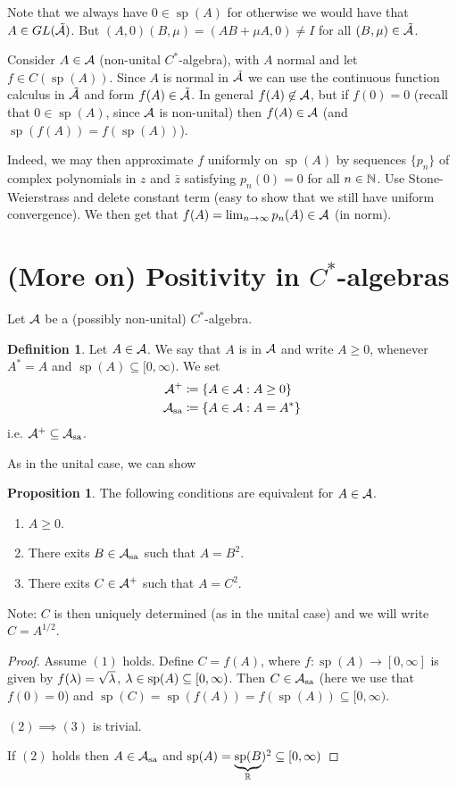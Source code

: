 \documentclass[10pt,english,a4paper]{article}
\theoremstyle{definition}
\newtheorem*{definition}{Definition}
\newtheorem*{proposition}{Proposition}
\let\emph\relax %
\def\Assa{\As_{\text{sa}}}
\DeclareMathOperator{\Sp}{sp}
\begin{document}
Note that we always have $0 \in \Sp(A)$ for otherwise we would have that 
$A \in GL(\tilde{\mathcal{A}})$. But $(A,0)(B,\mu) = (AB +\mu A,0) \neq I$ for all
$(B,\mu) \in \tilde{\mathcal{A}}$.




Consider $A \in \mathcal{A}$ (non-unital $C^*$-algebra), with $A$ normal and let 
$f \in C(\Sp(A))$. 
Since $A$ is normal in $\tilde{\mathcal{A}}$ we can use the continuous function
calculus in $\tilde{\mathcal{A}}$ and form $f(A) \in \tilde{\mathcal{A}}$. In general 
$f(A) \not\in \mathcal{A}$, but if $f(0)=0$ (recall that $0 \in \Sp(A)$, since $\mathcal{A}$ is
non-unital) then $f(A) \in \mathcal{A}$  (and $\Sp(f(A)) = f(\Sp(A))$).

Indeed, we may then approximate $f$ uniformly on $\Sp(A)$ by sequences 
$\{p_n\}$ of complex polynomials in $z$ and $\bar{z}$ satisfying $p_n(0) =0$
for all $n \in \mathbb{N}$.
Use Stone-Weierstrass and delete constant term (easy to show that we still have
uniform convergence). We then get that $f(A) = \lim_{n\to\infty} p_n(A) \in
\mathcal{A}$ (in norm).

\section{(More on) Positivity in $C^*$-algebras}
Let $\mathcal{A}$ be a (possibly non-unital) $C^*$-algebra.
\begin{definition}
    Let $A \in \mathcal{A}$. We say that $A$ is \emph{positive} in $\mathcal{A}$ and 
    write $A \geq 0$, whenever $A^*=A$ and $\Sp(A) \subseteq [0,\infty)$.
    We set 
    \begin{align*}
        \As^+ &\coloneqq \{ A \in \As : A \geq 0 \} \\
        \Assa &\coloneqq \{ A \in \As : A = A^* \}
    \end{align*}
i.e. $\As^+ \subseteq \Assa$.
\end{definition}

As in the unital case, we can show 
\begin{proposition}
    The following conditions are equivalent for $A \in \mathcal{A}$.
\begin{enumerate}[(1)]
    \item $A \geq 0$. 
    \item There exits $B \in \Assa$ such that $A = B^2$.
    \item There exits $C \in \mathcal{A}^+$ such that $A = C^2$.
\end{enumerate}
Note: $C$ is then uniquely determined (as in the unital case) and we will
write $C = A^{1/2}$.
\end{proposition}
\begin{proof}Assume $(1)$ holds.
    Define $C = f(A)$, where $f \colon \Sp(A) \to[0,\infty]$ is given by 
    $f(\lambda) = \sqrt{\lambda}$, $\la \in \Sp(A) \subseteq [0,\infty)$.
    Then $C \in \Assa$ (here we use that $f(0)=0$) and 
    $\Sp(C) = \Sp(f(A)) = f(\Sp(A)) \subseteq [0,\infty)$. 

    $(2)\implies(3)$ is trivial.

    If $(2)$ holds then $A \in \Assa$ and $\Sp(A) = \ub{\Sp(B}_{\R})^{2} \subseteq [0,\infty)$
\end{proof}
\end{document}
